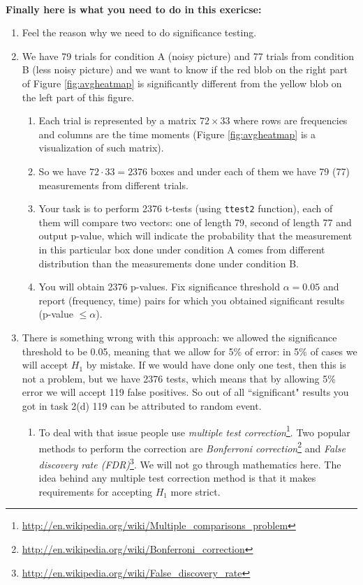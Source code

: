 \documentclass[a4paper,11pt]{article}
\begin{document}
\ \\
\textbf{Finally here is what you need to do in this exericse:}\\
\begin{enumerate}
	\item Feel the reason why we need to do significance testing.
	\item We have 79 trials for condition A (noisy picture) and 77 trials from condition B (less noisy picture) and we want to know if the red blob on the right part of Figure \ref{fig:avgheatmap} is significantly different from the yellow blob on the left part of this figure.
	\begin{enumerate}
		\item Each trial is represented by a matrix $72 \times 33$ where rows are frequencies and columns are the time moments (Figure \ref{fig:avgheatmap} is a visualization of such matrix).
		\item So we have $72 \cdot 33 = 2376$ boxes and under each of them we have 79 (77) measurements from different trials.
		\item Your task is to perform 2376 t-tests (using \texttt{ttest2} function), each of them will compare two vectors: one of length 79, second of length 77 and output p-value, which will indicate the probability that the measurement in this particular box done under condition A comes from different distribution than the measurements done under condition B.
		\item You will obtain 2376 p-values. Fix significance threshold $\alpha = 0.05$ and report (frequency, time) pairs for which you obtained significant results (p-value $\leqslant \alpha$).
	\end{enumerate}
	\item There is something wrong with this approach: we allowed the significance threshold to be 0.05, meaning that we allow for 5\% of error: in 5\% of cases we will accept $H_1$ by mistake. If we would have done only one test, then this is not a problem, but we have 2376 tests, which means that by allowing 5\% error we will accept 119 false positives. So out of all ``significant" results you got in task 2(d) 119 can be attributed to random event.
	\begin{enumerate}
		\item To deal with that issue people use \emph{multiple test correction}\footnote{\url{http://en.wikipedia.org/wiki/Multiple_comparisons_problem}}. Two popular methods to perform the correction are \emph{Bonferroni correction}\footnote{\url{http://en.wikipedia.org/wiki/Bonferroni_correction}} and \emph{False discovery rate (FDR)}\footnote{\url{http://en.wikipedia.org/wiki/False_discovery_rate}}. We will not go through mathematics here. The idea behind any multiple test correction method is that it makes requirements for accepting $H_1$ more strict.

\end{enumerate}
\end{enumerate}
\end{document}
